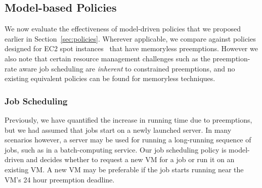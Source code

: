   



\vspace*{\subsecspace}
\subsection{Model-based Policies}
\label{subsec:eval-policy}

We now evaluate the effectiveness of model-driven policies that we proposed earlier in Section~\ref{sec:policies}.
%
Wherever applicable, we compare against policies designed for EC2 spot instances~\cite{harlap2018tributary, spoton} that have memoryless preemptions. 
%
However we also note that certain resource management challenges such as the preemption-rate aware job scheduling are \emph{inherent} to constrained preemptions, and no existing equivalent policies can be found for memoryless techniques. 




\vspace*{\subsecspace}
\subsubsection{Job Scheduling}

Previously, we have quantified the increase in running time due to preemptions, but we had assumed that jobs start on a newly launched server.
In many scenarios however, a server may be used for running a long-running sequence of jobs, such as in a batch-computing service. 
%
Our job scheduling policy is model-driven and decides whether to request a new VM for a job or run it on an existing VM.
A new VM may be preferable if the job starts running near the VM's 24 hour preemption deadline.

